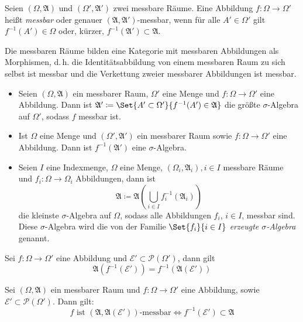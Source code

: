 \documentclass{cheat-sheet}
\newcommand{\Alg}{\mathfrak{A}}
\begin{document}
\begin{defn}
  Seien $(\Omega, \Alg)$ und $(\Omega', \Alg')$ zwei messbare Räume. Eine Abbildung $f : \Omega \to \Omega'$ heißt \emph{messbar} oder genauer $(\Alg, \Alg')$-messbar, wenn für alle $A' \in \Omega'$ gilt $f^{-1}(A') \in \Omega$ oder, kürzer, $f^{-1}(\Alg') \subset \Alg$.
\end{defn}

\begin{bem}
  Die messbaren Räume bilden eine Kategorie mit messbaren Abbildungen als Morphismen, d.\,h. die Identitätsabbildung von einem messbaren Raum zu sich selbst ist messbar und die Verkettung zweier messbarer Abbildungen ist messbar.
\end{bem}

\begin{satz}
  \begin{itemize}
    \item Seien $(\Omega, \Alg)$ ein messbarer Raum, $\Omega'$ eine Menge und $f : \Omega \to \Omega'$ eine Abbildung. Dann ist $\Alg' \coloneqq \Set{ A' \subset \Omega' }{ f^{-1}(A') \in \Alg }$ die größte $\sigma$-Algebra auf $\Omega'$, sodass $f$ messbar ist.
    \item Ist $\Omega$ eine Menge und $(\Omega', \Alg')$ ein messbarer Raum sowie $f : \Omega \to \Omega'$ eine Abbildung. Dann ist $f^{-1}(\Alg')$ eine $\sigma$-Algebra.
    \item Seien $I$ eine Indexmenge, $\Omega$ eine Menge, $(\Omega_i, \Alg_i), i \in I$ messbare Räume und $f_i : \Omega \to \Omega_i$ Abbildungen, dann ist
    \[ \Alg \coloneqq \Alg\left( \bigcup_{i \in I} f_i^{-1}(\Alg_i) \right) \]
    die kleinste $\sigma$-Algebra auf $\Omega$, sodass alle Abbildungen $f_i$, $i \in I$, messbar sind. Diese $\sigma$-Algebra wird die von der Familie $\Set{ f_i }{i \in I}$ \emph{erzeugte $\sigma$-Algebra} genannt.
  \end{itemize}
\end{satz}

\begin{satz}
  Sei $f : \Omega \to \Omega'$ eine Abbildung und $\mathcal{E}' \subset \mathcal{P}(\Omega')$, dann gilt
  \[ \Alg(f^{-1}(\mathcal{E}')) = f^{-1}(\Alg(\mathcal{E}')) \]
\end{satz}

\begin{satz}
  Sei $(\Omega, \Alg)$ ein messbarer Raum und $f : \Omega \to \Omega'$ eine Abbildung, sowie $\mathcal{E'} \subset \mathcal{P}(\Omega')$. Dann gilt:
  \[ f \text{ ist } (\Alg, \Alg(\mathcal{E}')) \text{-messbar} \iff f^{-1}(\mathcal{E}') \subset \Alg \]
\end{satz}
\end{document}
